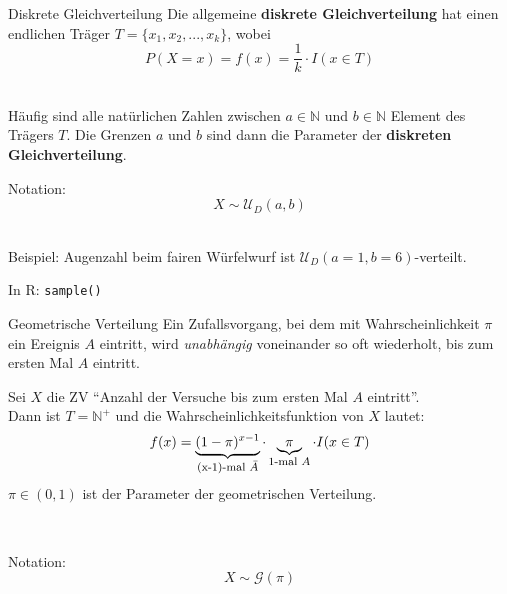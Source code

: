\documentclass[
  10pt,
  ignorenonframetext,
]{beamer}
\begin{document}
\begin{frame}[fragile]{Diskrete Gleichverteilung}
\label{diskrete-gleichverteilung}
Die allgemeine \textbf{diskrete Gleichverteilung} hat einen endlichen
Träger \({T} = \{x_1, x_2, ..., x_k\}\), wobei
\[ P(X = x) = f(x) = \frac{1}{k} \cdot I(x \in T)\]~

Häufig sind alle natürlichen Zahlen zwischen \(a \in \mathbb{N}\) und
\(b\in \mathbb{N}\) Element des Trägers \({T}\). Die Grenzen \(a\) und
\(b\) sind dann die Parameter der \textbf{diskreten Gleichverteilung}.~

Notation: \[X \sim {\mathcal U}_D(a, b)\]~

Beispiel: Augenzahl beim fairen Würfelwurf ist
\({\mathcal U}_D(a=1, b=6)\)-verteilt.

In R: \texttt{sample()}
\end{frame}

\begin{frame}{Geometrische Verteilung}
\label{geometrische-verteilung}
Ein Zufallsvorgang, bei dem mit Wahrscheinlichkeit \(\pi\) ein Ereignis
\(A\) eintritt, wird \emph{unabhängig} voneinander so oft wiederholt,
bis zum ersten Mal \(A\) eintritt.

Sei \(X\) die ZV ``Anzahl der Versuche bis zum ersten Mal \(A\)
eintritt''.\\
Dann ist \({T} = \mathbb{N}^+\) und die Wahrscheinlichkeitsfunktion von
\(X\) lautet: \[
f(x) =\underbrace{(1 - \pi)^{x-1}}_{\mbox{\footnotesize  (x-1)-mal $\bar{A}$}}\cdot \underbrace{\pi}_{\mbox{\footnotesize  1-mal $A$}} \cdot I(x \in T)
\] \(\pi \in (0,1)\) ist der Parameter der geometrischen Verteilung.\\
\strut ~

Notation: \[X \sim {\mathcal G}(\pi)\]\\

\end{frame}
\end{document}
